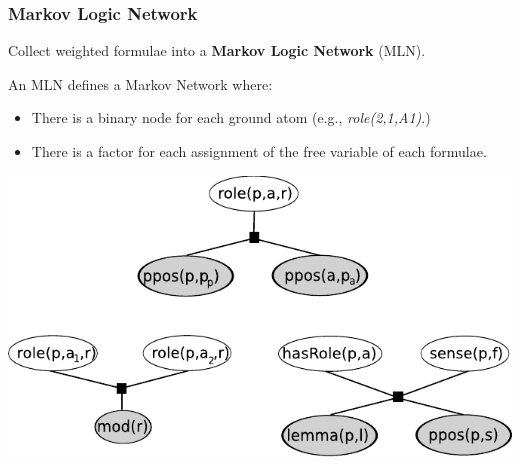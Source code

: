 \documentclass{beamer} \setbeamertemplate{navigation symbols}{}
\begin{document}
\begin{frame}
  \frametitle{Markov Logic Network}
  Collect weighted formulae into a \textbf{Markov Logic Network} (MLN).

  An MLN defines a Markov Network where:
  \begin{itemize}
  \item There is a binary node for each ground atom (e.g.,
    \emph{role(2,1,A1)}.)
  \item There is a factor for each assignment of the free variable of
    each formulae.
  \end{itemize}

  \begin{center}
    \includegraphics[scale=.55]{factor_graphs}
  \end{center}



\end{frame}
\end{document}
